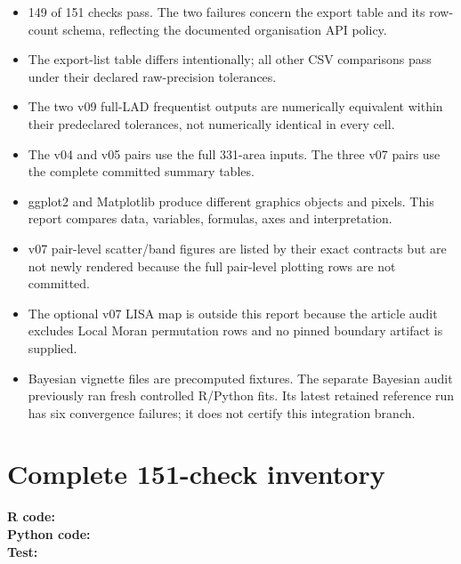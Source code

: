 \documentclass[10pt]{article}
\begin{document}
\begin{itemize}
\item 149 of 151 checks pass. The two failures concern the export table and
its row-count schema, reflecting the documented organisation API policy.
\item The export-list table differs intentionally; all other CSV comparisons pass
under their declared raw-precision tolerances.
\item The two v09 full-LAD frequentist outputs are numerically equivalent within
their predeclared tolerances, not numerically identical in every cell.
\item The v04 and v05 pairs use the full 331-area inputs. The three v07 pairs use
the complete committed summary tables.
\item ggplot2 and Matplotlib produce different graphics objects and pixels. This
report compares data, variables, formulas, axes and interpretation.
\item v07 pair-level scatter/band figures are listed by their exact contracts but
are not newly rendered because the full pair-level plotting rows are not committed.
\item The optional v07 LISA map is outside this report because the article audit
excludes Local Moran permutation rows and no pinned boundary artifact is supplied.
\item Bayesian vignette files are precomputed fixtures. The separate Bayesian audit
previously ran fresh controlled R/Python fits. Its latest retained reference
run has six convergence failures; it does not certify this integration branch.
\end{itemize}

\appendix
\section{Complete 151-check inventory}
{\footnotesize \textbf{R code:} \\ \textbf{Python code:} \\ \textbf{Test:} \par}
\end{document}
